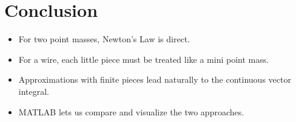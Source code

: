 \documentclass{ximera}
\begin{document}
\section*{Conclusion}

\begin{itemize}
\item For two point masses, Newton's Law is direct.  
\item For a wire, each little piece must be treated like a mini point mass.  
\item Approximations with finite pieces lead naturally to the continuous vector integral.  
\item MATLAB lets us compare and visualize the two approaches.
\end{itemize}
\end{document}
